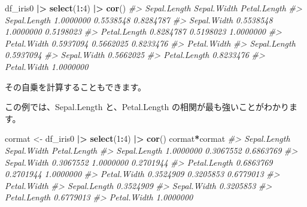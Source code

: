 \documentclass[
  xelatex, ja=standard]{bxjsbook}
\newenvironment{Shaded}{\begin{snugshade}}{\end{snugshade}}
\newcommand{\CommentTok}[1]{\textcolor[rgb]{0.56,0.35,0.01}{\textit{#1}}}
\newcommand{\DecValTok}[1]{\textcolor[rgb]{0.00,0.00,0.81}{#1}}
\newcommand{\FunctionTok}[1]{\textcolor[rgb]{0.13,0.29,0.53}{\textbf{#1}}}
\newcommand{\NormalTok}[1]{#1}
\newcommand{\OtherTok}[1]{\textcolor[rgb]{0.56,0.35,0.01}{#1}}
\newcommand{\SpecialCharTok}[1]{\textcolor[rgb]{0.81,0.36,0.00}{\textbf{#1}}}
\theoremstyle{definition}
\theoremstyle{definition}
\theoremstyle{definition}
\theoremstyle{definition}
\theoremstyle{remark}
\begin{document}
\begin{Shaded}
\begin{Highlighting}[]
\NormalTok{df\_iris0 }\SpecialCharTok{|\textgreater{}} \FunctionTok{select}\NormalTok{(}\DecValTok{1}\SpecialCharTok{:}\DecValTok{4}\NormalTok{) }\SpecialCharTok{|\textgreater{}} \FunctionTok{cor}\NormalTok{()}
\CommentTok{\#\textgreater{}              Sepal.Length Sepal.Width Petal.Length}
\CommentTok{\#\textgreater{} Sepal.Length    1.0000000   0.5538548    0.8284787}
\CommentTok{\#\textgreater{} Sepal.Width     0.5538548   1.0000000    0.5198023}
\CommentTok{\#\textgreater{} Petal.Length    0.8284787   0.5198023    1.0000000}
\CommentTok{\#\textgreater{} Petal.Width     0.5937094   0.5662025    0.8233476}
\CommentTok{\#\textgreater{}              Petal.Width}
\CommentTok{\#\textgreater{} Sepal.Length   0.5937094}
\CommentTok{\#\textgreater{} Sepal.Width    0.5662025}
\CommentTok{\#\textgreater{} Petal.Length   0.8233476}
\CommentTok{\#\textgreater{} Petal.Width    1.0000000}
\end{Highlighting}
\end{Shaded}

その自乗を計算することもできます。

この例では、Sepal.Length と、Petal.Length の相関が最も強いことがわかります。

\begin{Shaded}
\begin{Highlighting}[]
\NormalTok{cormat }\OtherTok{\textless{}{-}}\NormalTok{ df\_iris0 }\SpecialCharTok{|\textgreater{}} \FunctionTok{select}\NormalTok{(}\DecValTok{1}\SpecialCharTok{:}\DecValTok{4}\NormalTok{) }\SpecialCharTok{|\textgreater{}} \FunctionTok{cor}\NormalTok{()}
\NormalTok{cormat}\SpecialCharTok{*}\NormalTok{cormat}
\CommentTok{\#\textgreater{}              Sepal.Length Sepal.Width Petal.Length}
\CommentTok{\#\textgreater{} Sepal.Length    1.0000000   0.3067552    0.6863769}
\CommentTok{\#\textgreater{} Sepal.Width     0.3067552   1.0000000    0.2701944}
\CommentTok{\#\textgreater{} Petal.Length    0.6863769   0.2701944    1.0000000}
\CommentTok{\#\textgreater{} Petal.Width     0.3524909   0.3205853    0.6779013}
\CommentTok{\#\textgreater{}              Petal.Width}
\CommentTok{\#\textgreater{} Sepal.Length   0.3524909}
\CommentTok{\#\textgreater{} Sepal.Width    0.3205853}
\CommentTok{\#\textgreater{} Petal.Length   0.6779013}
\CommentTok{\#\textgreater{} Petal.Width    1.0000000}
\end{Highlighting}
\end{Shaded}
\end{document}
